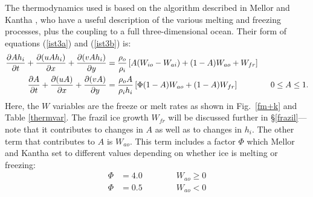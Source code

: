 The thermodynamics used is based on the algorithm described in
Mellor and Kantha \cite{Mellor89}, who have a useful description of the
various melting and freezing processes, plus the coupling to a full
three-dimensional ocean. Their form of equations
(\ref{ist3a}) and (\ref{ist3b}) is:
\begin{align}
  {\partial A h_i \over \partial t} +
  {\partial (u A h_i) \over \partial x} +
  {\partial (v A h_i) \over \partial y}
  & = {\rho_o \over \rho_i} \left[ A (W_{io} - W_{ai}) + (1-A) W_{ao}
  + W_{fr} \right]
\label{ist4a} \\
  {\partial A \over \partial t} +
  {\partial (uA) \over \partial x} + {\partial (vA) \over \partial y}
  & = {\rho_o A \over \rho_i h_i} \left[ \Phi (1-A) W_{ao} + (1-A)
  W_{fr} \right] \qquad \qquad 0 \leq A \leq 1 .
\label{ist4b}
\end{align}
Here, the $W$ variables are the freeze or
melt rates as shown in Fig.\ \ref{fm+k} and Table \ref{thermvar}.  The
frazil ice growth $W_{fr}$ will be discussed further in
\S\ref{frazil}---note that it contributes to changes in $A$ as well as
to changes in $h_i$.  The other term that contributes to $A$ is
$W_{ao}$.  This term includes a factor $\Phi$ which Mellor and Kantha
set to different values depending on whether ice is melting or
freezing:
\begin{align}
    \Phi & = 4.0 \qquad\qquad W_{ao} \geq 0 \\
    \Phi & = 0.5 \qquad\qquad W_{ao} < 0 \\
\end{align}

